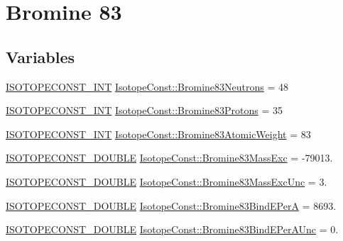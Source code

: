 \hypertarget{group___isotope_const-_bromine-_br83}{}\section{Bromine 83}
\label{group___isotope_const-_bromine-_br83}
\subsection*{Variables}
\begin{DoxyCompactItemize}
\item 
\mbox{\hyperlink{group___isotope_const-_macros_ga5f18360b3e99483a35c32d789e62621c}{I\+S\+O\+T\+O\+P\+E\+C\+O\+N\+S\+T\+\_\+\+I\+NT}} \mbox{\hyperlink{group___isotope_const-_bromine-_br83_gadbc07d10734614c741f28cabcf673634}{Isotope\+Const\+::\+Bromine83\+Neutrons}} = 48
\item 
\mbox{\hyperlink{group___isotope_const-_macros_ga5f18360b3e99483a35c32d789e62621c}{I\+S\+O\+T\+O\+P\+E\+C\+O\+N\+S\+T\+\_\+\+I\+NT}} \mbox{\hyperlink{group___isotope_const-_bromine-_br83_gaaad9b32f40281f8c125d2dd9970029ee}{Isotope\+Const\+::\+Bromine83\+Protons}} = 35
\item 
\mbox{\hyperlink{group___isotope_const-_macros_ga5f18360b3e99483a35c32d789e62621c}{I\+S\+O\+T\+O\+P\+E\+C\+O\+N\+S\+T\+\_\+\+I\+NT}} \mbox{\hyperlink{group___isotope_const-_bromine-_br83_ga94c3d9e4993473183cd7ac182e878cd3}{Isotope\+Const\+::\+Bromine83\+Atomic\+Weight}} = 83
\item 
\mbox{\hyperlink{group___isotope_const-_macros_ga8f45a7272ce02c0b4c65c44636ed719a}{I\+S\+O\+T\+O\+P\+E\+C\+O\+N\+S\+T\+\_\+\+D\+O\+U\+B\+LE}} \mbox{\hyperlink{group___isotope_const-_bromine-_br83_ga09536a87b05b413eee0c54867eb993c6}{Isotope\+Const\+::\+Bromine83\+Mass\+Exc}} = -\/79013.
\item 
\mbox{\hyperlink{group___isotope_const-_macros_ga8f45a7272ce02c0b4c65c44636ed719a}{I\+S\+O\+T\+O\+P\+E\+C\+O\+N\+S\+T\+\_\+\+D\+O\+U\+B\+LE}} \mbox{\hyperlink{group___isotope_const-_bromine-_br83_ga1ddc9acbdd5b029827d47a6959651d8b}{Isotope\+Const\+::\+Bromine83\+Mass\+Exc\+Unc}} = 3.
\item 
\mbox{\hyperlink{group___isotope_const-_macros_ga8f45a7272ce02c0b4c65c44636ed719a}{I\+S\+O\+T\+O\+P\+E\+C\+O\+N\+S\+T\+\_\+\+D\+O\+U\+B\+LE}} \mbox{\hyperlink{group___isotope_const-_bromine-_br83_ga1670e6961115fedb3ffb87b2a885b216}{Isotope\+Const\+::\+Bromine83\+Bind\+E\+PerA}} = 8693.
\item 
\mbox{\hyperlink{group___isotope_const-_macros_ga8f45a7272ce02c0b4c65c44636ed719a}{I\+S\+O\+T\+O\+P\+E\+C\+O\+N\+S\+T\+\_\+\+D\+O\+U\+B\+LE}} \mbox{\hyperlink{group___isotope_const-_bromine-_br83_ga4dd2349e64dc0ba281765b1e19ec346b}{Isotope\+Const\+::\+Bromine83\+Bind\+E\+Per\+A\+Unc}} = 0.

\end{DoxyCompactItemize}
